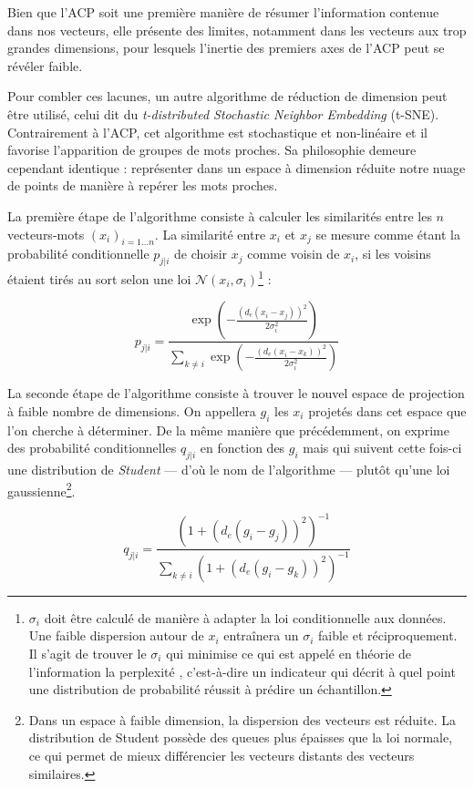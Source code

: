 \documentclass[11pt,french,french]{article}
\let\rmarkdownfootnote\footnote%
\def\footnote{\protect\rmarkdownfootnote}
\begin{document}
Bien que l'ACP soit une première manière de résumer l'information
contenue dans nos vecteurs, elle présente des limites, notamment dans
les vecteurs aux trop grandes dimensions, pour lesquels l'inertie des
premiers axes de l'ACP peut se révéler faible.

Pour combler ces lacunes, un autre algorithme de réduction de dimension
peut être utilisé, celui dit du \emph{t-distributed Stochastic Neighbor
Embedding} (t-SNE). Contrairement à l'ACP, cet algorithme est
stochastique et non-linéaire et il favorise l'apparition de groupes de
mots proches. Sa philosophie demeure cependant identique : représenter
dans un espace à dimension réduite notre nuage de points de manière à
repérer les mots proches.

La première étape de l'algorithme consiste à calculer les similarités
entre les \(n\) vecteurs-mots \((x_i)_{i=1...n}\). La similarité entre
\(x_i\) et \(x_j\) se mesure comme étant la probabilité conditionnelle
\(p_{j|i}\) de choisir \(x_j\) comme voisin de \(x_i\), si les voisins
étaient tirés au sort selon une loi
\(\mathcal{N}(x_i, \sigma_i)\)\footnote{\(\sigma_i\) doit être calculé
  de manière à adapter la loi conditionnelle aux données. Une faible
  dispersion autour de \(x_i\) entraînera un \(\sigma_i\) faible et
  réciproquement. Il s'agit de trouver le \(\sigma_i\) qui minimise ce
  qui est appelé en théorie de l'information la \og perplexité \fg{},
  c'est-à-dire un indicateur qui décrit à quel point une distribution de
  probabilité réussit à prédire un échantillon.} :

\[ p_{j|i} = \frac{
\exp\left(-\frac{(d_e(x_i - x_j))^2}{2\sigma_i^2}\right)
}{
\sum_{k \neq i}
\exp\left(-\frac{(d_e(x_i - x_k))^2}{2\sigma_i^2}\right)
}\]

La seconde étape de l'algorithme consiste à trouver le nouvel espace de
projection à faible nombre de dimensions. On appellera \(g_i\) les
\(x_i\) projetés dans cet espace que l'on cherche à déterminer. De la
même manière que précédemment, on exprime des probabilité
conditionnelles \(q_{j|i}\) en fonction des \(g_i\) mais qui suivent
cette fois-ci une distribution de \emph{Student} --- d'où le nom de
l'algorithme --- plutôt qu'une loi gaussienne\footnote{Dans un espace à
  faible dimension, la dispersion des vecteurs est réduite. La
  distribution de Student possède des queues plus épaisses que la loi
  normale, ce qui permet de mieux différencier les vecteurs distants des
  vecteurs similaires.}.

\[ q_{j|i} = \frac{(1+ (d_e(g_i - g_j))^2)^{-1}}{\sum_{k \neq i}{(1+ (d_e(g_i - g_k))^2)^{-1}}}\]
\end{document}
